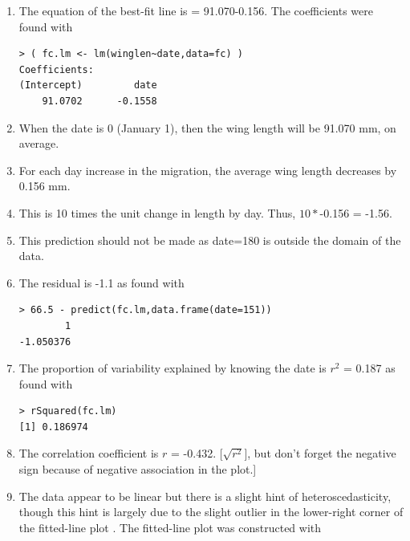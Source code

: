 \documentclass[10pt,openany]{book}\usepackage[]{graphicx}\usepackage[]{color}
\makeatletter
\newenvironment{kframe}{%
 \def\at@end@of@kframe{}%
 \ifinner\ifhmode%
  \def\at@end@of@kframe{\end{minipage}}%
  \begin{minipage}{\columnwidth}%
 \fi\fi%
 \def\FrameCommand##1{\hskip\@totalleftmargin \hskip-\fboxsep
 \colorbox{shadecolor}{##1}\hskip-\fboxsep
     \hskip-\linewidth \hskip-\@totalleftmargin \hskip\columnwidth}%
 \MakeFramed {\advance\hsize-\width
   \@totalleftmargin\z@ \linewidth\hsize
   \@setminipage}}%
 {\par\unskip\endMakeFramed%
 \at@end@of@kframe}
\newenvironment{knitrout}{}{} %
\makeatother
\begin{document}
\begin{itemize}
\begin{enumerate}
      \item The equation of the best-fit line is  = 91.070-0.156.  The coefficients were found with
\begin{knitrout}
\color{fgcolor}\begin{kframe}
\begin{verbatim}
> ( fc.lm <- lm(winglen~date,data=fc) )
Coefficients:
(Intercept)         date  
    91.0702      -0.1558  
\end{verbatim}
\end{kframe}
\end{knitrout}
      \item When the date is 0 (January 1), then the wing length will be 91.070 mm, on average.
      \item For each day increase in the migration, the average wing length decreases by 0.156 mm.
      \item This is 10 times the unit change in length by day. Thus, $10*$-0.156 = -1.56.
      \item This prediction should not be made as date=180 is outside the domain of the data.
      \item The residual is -1.1 as found with
\begin{knitrout}
\color{fgcolor}\begin{kframe}
\begin{verbatim}
> 66.5 - predict(fc.lm,data.frame(date=151))
        1 
-1.050376 
\end{verbatim}
\end{kframe}
\end{knitrout}
      \item The proportion of variability explained by knowing the date is $r^{2}$ = 0.187 as found with
\begin{knitrout}
\color{fgcolor}\begin{kframe}
\begin{verbatim}
> rSquared(fc.lm)
[1] 0.186974
\end{verbatim}
\end{kframe}
\end{knitrout}
      \item The correlation coefficient is $r$ = -0.432. [$\sqrt{r^{2}}$], but don't forget the negative sign because of negative association in the plot.]
      \item The data appear to be linear but there is a slight hint of heteroscedasticity, though this hint is largely due to the slight outlier in the lower-right corner of the fitted-line plot .  The fitted-line plot was constructed with

\end{enumerate}
\end{itemize}
\end{document}
